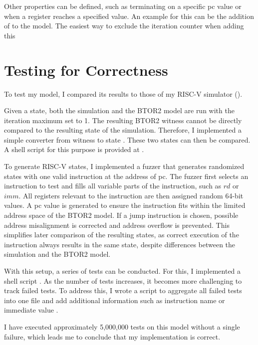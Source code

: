 Other properties can be defined, such as terminating on a specific pc
value or when a register reaches a specified value. An example for
this can be the addition of  to the model. The
easiest way to exclude the iteration counter when adding this






\section{Testing for Correctness}\label{sec:corectness}
To test my model, I compared its results to those of my RISC-V
simulator ().

Given a state, both the simulation and the BTOR2 model are run with
the iteration maximum set to 1. The resulting BTOR2 witness cannot be
directly compared to the resulting state of the simulation.
Therefore, I implemented a simple converter from witness to state
\cite[src/restate\_witness.c]{repoRV2BTOR}. These two states can then
be compared. A shell script for this purpose is provided at
\cite[sh\_utils/compare\_iterations.sh]{repoRV2BTOR}.

To generate RISC-V states, I implemented a fuzzer
\cite[src/state\_fuzzer.c]{repoRV2BTOR} that generates randomized
states with one valid instruction at the address of pc. The fuzzer
first selects an instruction to test and fills all variable parts of
the instruction, such as $rd$ or $imm$. All registers relevant to the
instruction are then assigned random 64-bit values. A pc value is
generated to ensure the instruction fits within the limited address
space of the BTOR2 model. If a jump instruction is chosen, possible
address misalignment is corrected and address overflow is prevented.
This simplifies later comparison of the resulting states, as correct
execution of the instruction always results in the same state,
despite differences between the simulation and the BTOR2 model.

With this setup, a series of tests can be conducted. For this, I
implemented a shell script
\cite[sh\_utils/test\_btor2\_model.sh]{repoRV2BTOR}. As the number of
tests increases, it becomes more challenging to track failed tests.
To address this, I wrote a script to aggregate all failed tests into
one file and add additional information such as instruction name or
immediate value \cite[sh\_utils/diff\_logger.sh]{repoRV2BTOR}.

I have executed approximately 5,000,000 tests on this model without a
single failure, which leads me to conclude that my implementation is
correct.
